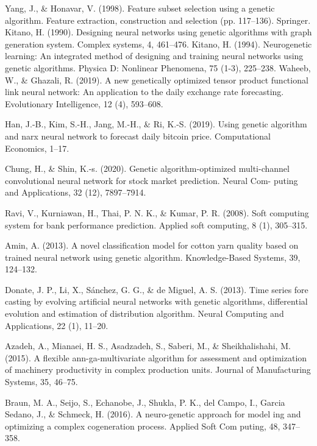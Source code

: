 \documentclass[12pt, a4paper, oneside]{ctexart}
\numberwithin{equation}{section}  %
\begin{document}
\begin{thebibliography}{99}
    Yang, J., \& Honavar, V. (1998). Feature subset selection using a genetic algorithm. Feature extraction, construction and selection (pp. 117–136). Springer.
    Kitano, H. (1990). Designing neural networks using genetic algorithms with graph generation system. Complex systems, 4, 461–476.
    Kitano, H. (1994). Neurogenetic learning: An integrated method of designing and training neural networks using genetic algorithms. Physica D: Nonlinear Phenomena, 75 (1-3), 225–238.
Waheeb, W., \& Ghazali, R. (2019). A new genetically optimized tensor product
functional link neural network: An application to the daily exchange
rate forecasting. Evolutionary Intelligence, 12 (4), 593–608.

Han, J.-B., Kim, S.-H., Jang, M.-H., \& Ri, K.-S. (2019). Using genetic algorithm
and narx neural network to forecast daily bitcoin price. Computational
Economics, 1–17.

Chung, H., \& Shin, K.-s. (2020). Genetic algorithm-optimized multi-channel
convolutional neural network for stock market prediction. Neural Com-
puting and Applications, 32 (12), 7897–7914.

Ravi, V., Kurniawan, H., Thai, P. N. K., \& Kumar, P. R. (2008). Soft computing
system for bank performance prediction. Applied soft computing, 8 (1),
305–315.

Amin, A. (2013). A novel classification model for cotton yarn quality based
on trained neural network using genetic algorithm. Knowledge-Based
Systems, 39, 124–132.

Donate, J. P., Li, X., Sánchez, G. G., \& de Miguel, A. S. (2013). Time series fore
casting by evolving artificial neural networks with genetic algorithms,
differential evolution and estimation of distribution algorithm. Neural
Computing and Applications, 22 (1), 11–20.

Azadeh, A., Mianaei, H. S., Asadzadeh, S., Saberi, M., \& Sheikhalishahi, M.
(2015). A flexible ann-ga-multivariate algorithm for assessment and
optimization of machinery productivity in complex production units.
Journal of Manufacturing Systems, 35, 46–75.

Braun, M. A., Seijo, S., Echanobe, J., Shukla, P. K., del Campo, I., Garcia
Sedano, J., \& Schmeck, H. (2016). A neuro-genetic approach for model
ing and optimizing a complex cogeneration process. Applied Soft Com
puting, 48, 347–358.


\end{thebibliography}
\end{document}
